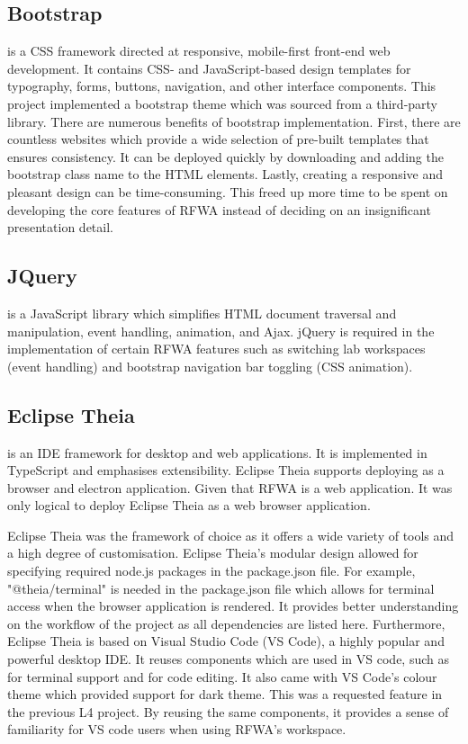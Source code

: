 \documentclass{l4proj}
\begin{document}
\subsection{Bootstrap}

\cite{Bootstrap} is a CSS framework directed at responsive, mobile-first front-end web development. It contains CSS- and JavaScript-based design templates for typography, forms, buttons, navigation, and other interface components. This project implemented a bootstrap theme which was sourced from a third-party library. There are numerous benefits of bootstrap implementation. First, there are countless websites which provide a wide selection of pre-built templates that ensures consistency. It can be deployed quickly by downloading and adding the bootstrap class name to the HTML elements. Lastly, creating a responsive and pleasant design can be time-consuming. This freed up more time to be spent on developing the core features of RFWA instead of deciding on an insignificant presentation detail. 

\subsection{JQuery}

\cite{jQuery} is a JavaScript library which simplifies HTML document traversal and manipulation, event handling, animation, and Ajax. jQuery is required in the implementation of certain RFWA features such as switching lab workspaces (event handling) and bootstrap navigation bar toggling (CSS animation).

\subsection{Eclipse Theia}

\cite{EclipseTheia} is an IDE framework for desktop and web applications. It is implemented in TypeScript and emphasises extensibility. Eclipse Theia supports deploying as a browser and electron application. Given that RFWA is a web application. It was only logical to deploy Eclipse Theia as a web browser application.

Eclipse Theia was the framework of choice as it offers a wide variety of tools and a high degree of customisation. Eclipse Theia's modular design allowed for specifying required node.js packages in the package.json file. For example, "@theia/terminal" is needed in the package.json file which allows for terminal access when the browser application is rendered. It provides better understanding on the workflow of the project as all dependencies are listed here. Furthermore, Eclipse Theia is based on Visual Studio Code (VS Code), a highly popular and powerful desktop IDE. It reuses components which are used in VS code, such as \cite{xtermjs} for terminal support and \cite{monacoeditor} for code editing. It also came with VS Code's colour theme which provided support for dark theme. This was a requested feature in the previous L4 project. By reusing the same components, it provides a sense of familiarity for VS code users when using RFWA's workspace.
\end{document}
